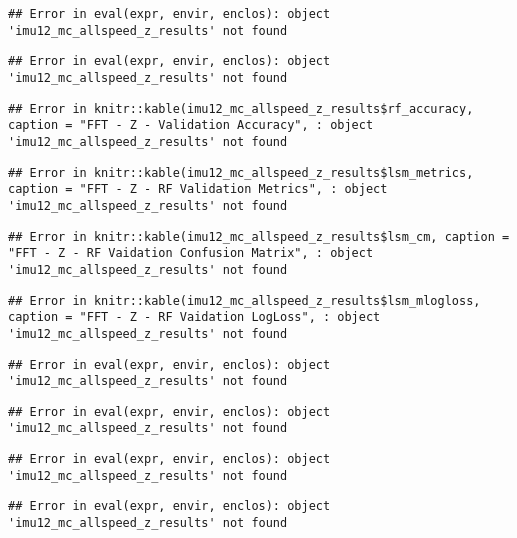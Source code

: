 \documentclass[]{article}
\begin{document}
\begin{verbatim}
## Error in eval(expr, envir, enclos): object 'imu12_mc_allspeed_z_results' not found
\end{verbatim}

\begin{verbatim}
## Error in eval(expr, envir, enclos): object 'imu12_mc_allspeed_z_results' not found
\end{verbatim}

\begin{verbatim}
## Error in knitr::kable(imu12_mc_allspeed_z_results$rf_accuracy, caption = "FFT - Z - Validation Accuracy", : object 'imu12_mc_allspeed_z_results' not found
\end{verbatim}

\begin{verbatim}
## Error in knitr::kable(imu12_mc_allspeed_z_results$lsm_metrics, caption = "FFT - Z - RF Validation Metrics", : object 'imu12_mc_allspeed_z_results' not found
\end{verbatim}

\begin{verbatim}
## Error in knitr::kable(imu12_mc_allspeed_z_results$lsm_cm, caption = "FFT - Z - RF Vaidation Confusion Matrix", : object 'imu12_mc_allspeed_z_results' not found
\end{verbatim}

\begin{verbatim}
## Error in knitr::kable(imu12_mc_allspeed_z_results$lsm_mlogloss, caption = "FFT - Z - RF Vaidation LogLoss", : object 'imu12_mc_allspeed_z_results' not found
\end{verbatim}

\begin{verbatim}
## Error in eval(expr, envir, enclos): object 'imu12_mc_allspeed_z_results' not found
\end{verbatim}

\begin{verbatim}
## Error in eval(expr, envir, enclos): object 'imu12_mc_allspeed_z_results' not found
\end{verbatim}

\begin{verbatim}
## Error in eval(expr, envir, enclos): object 'imu12_mc_allspeed_z_results' not found
\end{verbatim}

\begin{verbatim}
## Error in eval(expr, envir, enclos): object 'imu12_mc_allspeed_z_results' not found
\end{verbatim}
\end{document}
